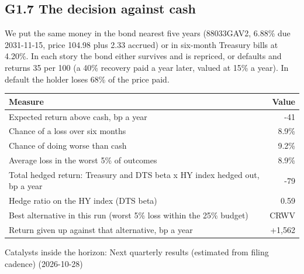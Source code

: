 \documentclass[11pt,a4paper]{article}
\begin{document}
\subsection*{G1.7 The decision against cash}
We put the same money in the bond nearest five years (88033GAV2, 6.88\% due 2031-11-15, price 104.98 plus 2.33 accrued) or in six-month Treasury bills at 4.20\%. In each story the bond either survives and is repriced, or defaults and returns 35 per 100 (a 40\% recovery paid a year later, valued at 15\% a year). In default the holder loses 68\% of the price paid.
\begin{center}\footnotesize\setlength{\tabcolsep}{3.5pt}\begin{tabular}{@{}lr@{}}\toprule
Measure & Value \\\midrule
Expected return above cash, bp a year & -41 \\
Chance of a loss over six months & 8.9\% \\
Chance of doing worse than cash & 9.2\% \\
Average loss in the worst 5\% of outcomes & 8.9\% \\
Total hedged return: Treasury and DTS beta x HY index hedged out, bp a year & -79 \\
Hedge ratio on the HY index (DTS beta) & 0.59 \\
Best alternative in this run (worst 5\% loss within the 25\% budget) & CRWV \\
Return given up against that alternative, bp a year & +1,562 \\
\bottomrule\end{tabular}\end{center}
Catalysts inside the horizon: Next quarterly results (estimated from filing cadence) (2026-10-28)
\end{document}
